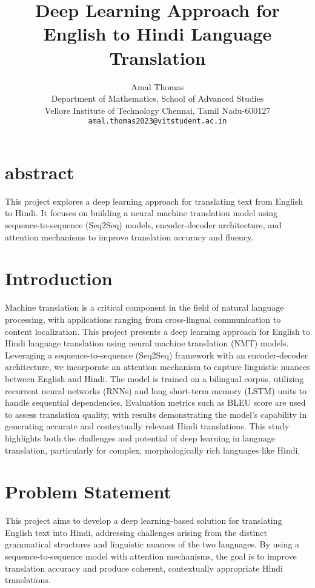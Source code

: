 \documentclass[12pt]{article}
\begin{document}
\title{\textbf{Deep Learning Approach for English to Hindi Language Translation}}
\author{
    Amal Thomas \\ 
    Department of Mathematics, School of Advanced Studies \\ 
    Vellore Institute of Technology Chennai, Tamil Nadu-600127 \\ 
    \texttt{amal.thomas2023@vitstudent.ac.in}
}
\date{}
\maketitle

\section{abstract}
This project explores a deep learning approach for translating text from English to Hindi. It focuses on building a neural machine translation model using sequence-to-sequence (Seq2Seq) models, encoder-decoder architecture, and attention mechanisms to improve translation accuracy and fluency.


\section{Introduction}
Machine translation is a critical component in the field of natural language processing, with applications ranging from cross-lingual communication to content localization. This project presents a deep learning approach for English to Hindi language translation using neural machine translation (NMT) models. Leveraging a sequence-to-sequence (Seq2Seq) framework with an encoder-decoder architecture, we incorporate an attention mechanism to capture linguistic nuances between English and Hindi. The model is trained on a bilingual corpus, utilizing recurrent neural networks (RNNs) and long short-term memory (LSTM) units to handle sequential dependencies. Evaluation metrics such as BLEU score are used to assess translation quality, with results demonstrating the model's capability in generating accurate and contextually relevant Hindi translations. This study highlights both the challenges and potential of deep learning in language translation, particularly for complex, morphologically rich languages like Hindi.

\section{Problem Statement}
This project aims to develop a deep learning-based solution for translating English text into Hindi, addressing challenges arising from the distinct grammatical structures and linguistic nuances of the two languages. By using a sequence-to-sequence model with attention mechanisms, the goal is to improve translation accuracy and produce coherent, contextually appropriate Hindi translations.
\end{document}
